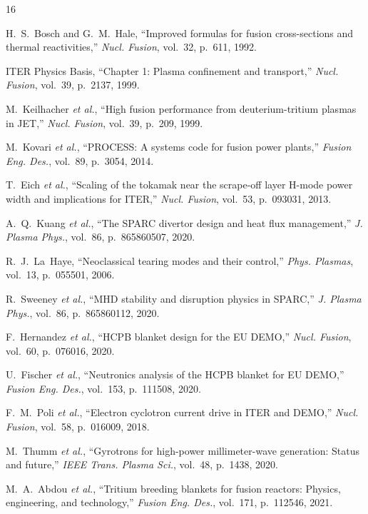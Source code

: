 \documentclass[11pt,a4paper]{article}
\begin{document}
\begin{thebibliography}{16}

 H.~S.~Bosch and G.~M.~Hale,
``Improved formulas for fusion cross-sections and thermal reactivities,''
\textit{Nucl. Fusion}, vol.~32, p.~611, 1992.

 ITER Physics Basis,
``Chapter 1: Plasma confinement and transport,''
\textit{Nucl. Fusion}, vol.~39, p.~2137, 1999.

 M.~Keilhacher \textit{et al.},
``High fusion performance from deuterium-tritium plasmas in JET,''
\textit{Nucl. Fusion}, vol.~39, p.~209, 1999.

 M.~Kovari \textit{et al.},
``PROCESS: A systems code for fusion power plants,''
\textit{Fusion Eng. Des.}, vol.~89, p.~3054, 2014.

 T.~Eich \textit{et al.},
``Scaling of the tokamak near the scrape-off layer H-mode power width
and implications for ITER,''
\textit{Nucl. Fusion}, vol.~53, p.~093031, 2013.

 A.~Q.~Kuang \textit{et al.},
``The SPARC divertor design and heat flux management,''
\textit{J. Plasma Phys.}, vol.~86, p.~865860507, 2020.

 R.~J.~La~Haye,
``Neoclassical tearing modes and their control,''
\textit{Phys. Plasmas}, vol.~13, p.~055501, 2006.

 R.~Sweeney \textit{et al.},
``MHD stability and disruption physics in SPARC,''
\textit{J. Plasma Phys.}, vol.~86, p.~865860112, 2020.

 F.~Hernandez \textit{et al.},
``HCPB blanket design for the EU DEMO,''
\textit{Nucl. Fusion}, vol.~60, p.~076016, 2020.

 U.~Fischer \textit{et al.},
``Neutronics analysis of the HCPB blanket for EU DEMO,''
\textit{Fusion Eng. Des.}, vol.~153, p.~111508, 2020.

 F.~M.~Poli \textit{et al.},
``Electron cyclotron current drive in ITER and DEMO,''
\textit{Nucl. Fusion}, vol.~58, p.~016009, 2018.

 M.~Thumm \textit{et al.},
``Gyrotrons for high-power millimeter-wave generation: Status and future,''
\textit{IEEE Trans. Plasma Sci.}, vol.~48, p.~1438, 2020.

 M.~A.~Abdou \textit{et al.},
``Tritium breeding blankets for fusion reactors:
Physics, engineering, and technology,''
\textit{Fusion Eng. Des.}, vol.~171, p.~112546, 2021.


\end{thebibliography}
\end{document}
